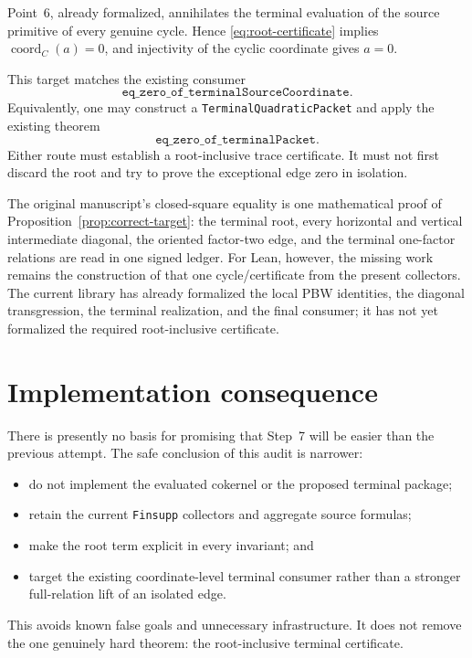 \documentclass[11pt]{article}
\theoremstyle{definition}
\theoremstyle{remark}
\begin{document}
Point~6, already formalized, annihilates the terminal evaluation of the
source primitive of every genuine cycle.  Hence
\eqref{eq:root-certificate} implies
\(\operatorname{coord}_C(a)=0\), and injectivity of the cyclic coordinate
gives \(a=0\).

This target matches the existing consumer
\[
             \texttt{eq\_zero\_of\_terminalSourceCoordinate}.
\]
Equivalently, one may construct a
\texttt{TerminalQuadraticPacket} and apply the existing theorem
\[
                    \texttt{eq\_zero\_of\_terminalPacket}.
\]
Either route must establish a root-inclusive trace certificate.  It must
not first discard the root and try to prove the exceptional edge zero in
isolation.

The original manuscript's closed-square equality is one mathematical proof
of Proposition~\ref{prop:correct-target}: the terminal root, every
horizontal and vertical intermediate diagonal, the oriented factor-two
edge, and the terminal one-factor relations are read in one signed ledger.
For Lean, however, the missing work remains the construction of that one
cycle/certificate from the present collectors.  The current library has
already formalized the local PBW identities, the diagonal transgression,
the terminal realization, and the final consumer; it has not yet formalized
the required root-inclusive certificate.

\section{Implementation consequence}

There is presently no basis for promising that Step~7 will be easier than
the previous attempt.  The safe conclusion of this audit is narrower:
\begin{itemize}
\item do not implement the evaluated cokernel or the proposed terminal
package;
\item retain the current \texttt{Finsupp} collectors and aggregate source
formulas;
\item make the root term explicit in every invariant; and
\item target the existing coordinate-level terminal consumer rather than a
stronger full-relation lift of an isolated edge.
\end{itemize}

This avoids known false goals and unnecessary infrastructure.  It does not
remove the one genuinely hard theorem: the root-inclusive terminal
certificate.
\end{document}
